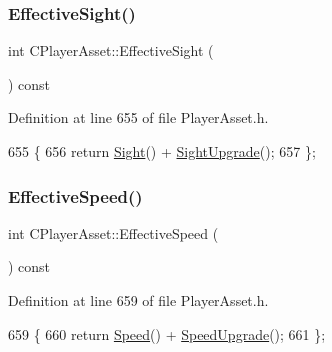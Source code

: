 \subsubsection{\texorpdfstring{Effective\+Sight()}{EffectiveSight()}}
{\footnotesize\ttfamily int C\+Player\+Asset\+::\+Effective\+Sight (\begin{DoxyParamCaption}{ }\end{DoxyParamCaption}) const\hspace{0.3cm}{\ttfamily [inline]}}



Definition at line 655 of file Player\+Asset.\+h.


\begin{DoxyCode}
655                                   \{
656             \textcolor{keywordflow}{return} \hyperlink{classCPlayerAsset_ac732622598cbd05dd2ec9233468e2b07}{Sight}() + \hyperlink{classCPlayerAsset_aaa297dbacfa25d61ce2b3498ed139c5b}{SightUpgrade}();
657         \};
\end{DoxyCode}
\hypertarget{classCPlayerAsset_af6d10fcbbd9cc861ced9ba3a85d387ab}{}\label{classCPlayerAsset_af6d10fcbbd9cc861ced9ba3a85d387ab} 
\subsubsection{\texorpdfstring{Effective\+Speed()}{EffectiveSpeed()}}
{\footnotesize\ttfamily int C\+Player\+Asset\+::\+Effective\+Speed (\begin{DoxyParamCaption}{ }\end{DoxyParamCaption}) const\hspace{0.3cm}{\ttfamily [inline]}}



Definition at line 659 of file Player\+Asset.\+h.


\begin{DoxyCode}
659                                   \{
660             \textcolor{keywordflow}{return} \hyperlink{classCPlayerAsset_af1c093600f1567e3abf1cefc0f5350d5}{Speed}() + \hyperlink{classCPlayerAsset_a6b6b17c9d4b1fe095120032bee4977af}{SpeedUpgrade}();
661         \};
\end{DoxyCode}
\hypertarget{classCPlayerAsset_a92dcc002f1349cc41c7870495484a442}{}\label{classCPlayerAsset_a92dcc002f1349cc41c7870495484a442} 
